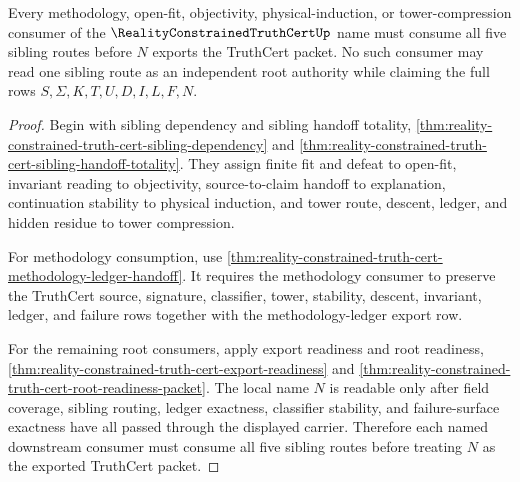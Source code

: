 \begin{theorem}
\label{thm:reality-constrained-truth-cert-root-consumer-totality}
Every methodology, open-fit, objectivity, physical-induction, or
tower-compression consumer of the $\RealityConstrainedTruthCertUp$ name must
consume all five sibling routes before $N$ exports the TruthCert packet. No
such consumer may read one sibling route as an independent root authority while
claiming the full rows $S,\Sigma,K,T,U,D,I,L,F,N$.
\end{theorem}
\begin{proof}
Begin with sibling dependency and sibling handoff totality,
\autoref{thm:reality-constrained-truth-cert-sibling-dependency} and
\autoref{thm:reality-constrained-truth-cert-sibling-handoff-totality}. They
assign finite fit and defeat to open-fit, invariant reading to objectivity,
source-to-claim handoff to explanation, continuation stability to physical
induction, and tower route, descent, ledger, and hidden residue to tower
compression.

For methodology consumption, use
\autoref{thm:reality-constrained-truth-cert-methodology-ledger-handoff}. It
requires the methodology consumer to preserve the TruthCert source, signature,
classifier, tower, stability, descent, invariant, ledger, and failure rows
together with the methodology-ledger export row.

For the remaining root consumers, apply export readiness and root readiness,
\autoref{thm:reality-constrained-truth-cert-export-readiness} and
\autoref{thm:reality-constrained-truth-cert-root-readiness-packet}. The local
name $N$ is readable only after field coverage, sibling routing, ledger
exactness, classifier stability, and failure-surface exactness have all passed
through the displayed carrier. Therefore each named downstream consumer must
consume all five sibling routes before treating $N$ as the exported TruthCert
packet.
\end{proof}

